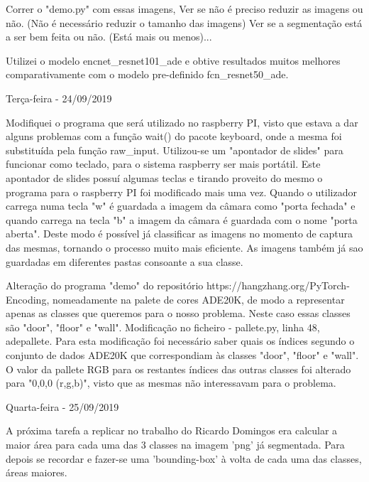         Correr o "demo.py" com essas imagens,
        Ver se não é preciso reduzir as imagens ou não. (Não é necessário reduzir o tamanho das imagens)
        Ver se a segmentação está a ser bem feita ou não. (Está mais ou menos)...
        
        Utilizei o modelo encnet\_resnet101\_ade e obtive resultados muitos melhores comparativamente com o modelo pre-definido fcn\_resnet50\_ade.
        
        
        \bigskip
        
        Terça-feira - 24/09/2019
        
        Modifiquei o programa que será utilizado no raspberry PI, visto que estava a dar alguns problemas com a função wait() do pacote keyboard, onde a mesma foi substituída pela função raw\_input. Utilizou-se um "apontador de slides" para funcionar como teclado, para o sistema raspberry ser mais portátil.
        Este apontador de slides possuí algumas teclas e tirando proveito do mesmo o programa para o raspberry PI foi modificado mais uma vez. Quando o utilizador carrega numa tecla "w" é guardada a imagem da câmara como "porta fechada" e quando carrega na tecla "b" a imagem da câmara é guardada com o nome "porta aberta". Deste modo é possível já classificar as imagens no momento de captura das mesmas, tornando o processo muito mais eficiente. As imagens também já sao guardadas em diferentes pastas consoante a sua classe.
        

        Alteração do programa "demo" do repositório https://hangzhang.org/PyTorch-Encoding, nomeadamente na palete de cores ADE20K, de modo a representar apenas as classes que queremos para o nosso problema. Neste caso essas classes são "door", "floor" e "wall".
        Modificação no ficheiro - pallete.py, linha 48, adepallete.
        Para esta modificação foi necessário saber quais os índices segundo o conjunto de dados ADE20K que correspondiam às classes "door", "floor" e "wall". O valor da pallete RGB para os restantes índices das outras classes foi alterado para "0,0,0 (r,g,b)", visto que as mesmas não interessavam para o problema.
        
        
        
        \bigskip
        
        Quarta-feira - 25/09/2019
        
        A próxima tarefa a replicar no trabalho do Ricardo Domingos era calcular a maior área para cada uma das 3 classes na imagem 'png' já segmentada. Para depois se recordar e fazer-se uma 'bounding-box' à volta de cada uma das classes, áreas maiores.
        
